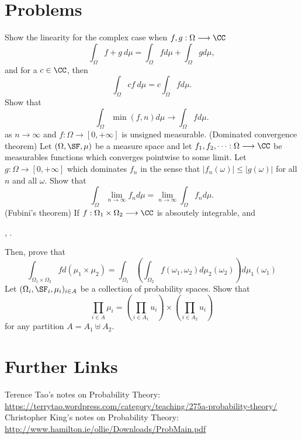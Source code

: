 \documentclass[11pt]{scrartcl}
\begin{document}
\section{Problems}
\begin{enumerate}
    \ii Show the linearity for the complex case when $f, g: \Omega \longrightarrow \CC$ 
    $$
    \int_{\Omega} f + g \ d\mu = \int_{\Omega} f d\mu + \int_{\Omega} g d\mu,
    $$
    and for a $c \in \CC$, then
    $$
    \int_{\Omega} cf \ d\mu = c\int_{\Omega} fd\mu.
    $$
    \ii Show that 
    $$
    \int_{\Omega} \min(f, n) d\mu \to \int_{\Omega} f d\mu.
    $$
    as $n \to \infty$ and $f: \Omega \to [0, +\infty]$ is unsigned measurable.
    \ii (Dominated convergence theorem) Let $(\Omega, \SF, \mu)$ be a measure space and let $f_{1}, f_{2}, \dots: \Omega \longrightarrow \CC$ be measurables functions which converges pointwise to some limit. Let $g: \Omega \longrightarrow [0, +\infty]$ which dominates $f_{n}$ in the sense that $|f_{n}(\omega)| \leq |g(\omega)|$ for all $n$ and all $\omega$. Show that 
    $$
    \int_{\Omega} \lim_{n \to \infty} f_{n} d\mu = \lim_{n \to \infty} \int_{\Omega} f_{n} d\mu.
    $$
    \ii (Fubini's theorem) If $f: \Omega_{1} \times \Omega_{2} \longrightarrow \CC$ is absoutely integrable, and
    \begin{enumerate}[I.]
    ,
    .
    \end{enumerate}
    Then, prove that
    $$
    \int_{\Omega_{1} \times \Omega_{2}} f d(\mu_{1} \times \mu_{2}) = \int_{\Omega_{1}} \left( \int_{\Omega_{2}} f(\omega_{1}, \omega_{2}) d\mu_{2}(\omega_{2})  \right) d\mu_{1}(\omega_{1}) 
    $$
    \ii Let $(\Omega_{i}, \SF_{i}, \mu_{i})_{i \in A}$ be a collection of probability spaces. Show that
    $$
    \prod_{i \in A} \mu_{i} = \left( \prod_{i \in A_{1}} u_{i}  \right) \times \left( \prod_{i \in A_{2}} u_{i}  \right)
    $$
    for any partition $A = A_{1} \uplus  A_{2}$.
\end{enumerate}

\section{Further Links}
\begin{itemize}
    \ii Terence Tao's notes on Probability Theory: \url{https://terrytao.wordpress.com/category/teaching/275a-probability-theory/}
    \ii Christopher King's notes on Probability Theory: \url{http://www.hamilton.ie/ollie/Downloads/ProbMain.pdf}
\end{itemize}
\end{document}
